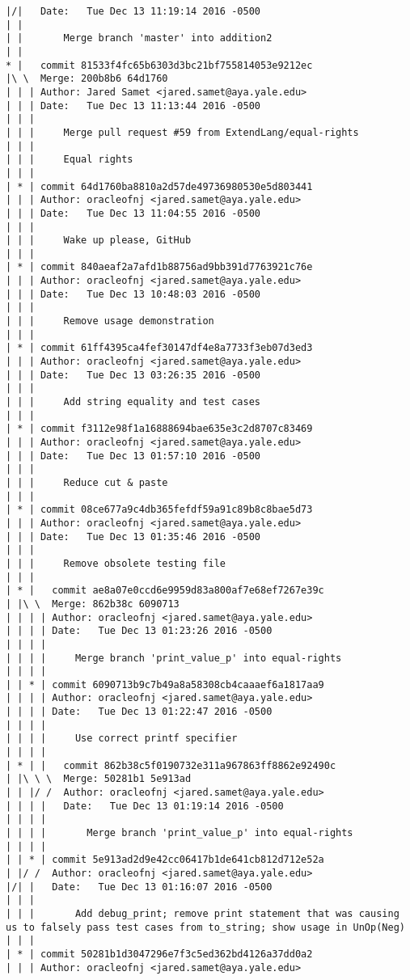 \begin{lstlisting}
|/|   Date:   Tue Dec 13 11:19:14 2016 -0500
| |   
| |       Merge branch 'master' into addition2
| |     
* |   commit 81533f4fc65b6303d3bc21bf755814053e9212ec
|\ \  Merge: 200b8b6 64d1760
| | | Author: Jared Samet <jared.samet@aya.yale.edu>
| | | Date:   Tue Dec 13 11:13:44 2016 -0500
| | | 
| | |     Merge pull request #59 from ExtendLang/equal-rights
| | |     
| | |     Equal rights
| | |    
| * | commit 64d1760ba8810a2d57de49736980530e5d803441
| | | Author: oracleofnj <jared.samet@aya.yale.edu>
| | | Date:   Tue Dec 13 11:04:55 2016 -0500
| | | 
| | |     Wake up please, GitHub
| | |    
| * | commit 840aeaf2a7afd1b88756ad9bb391d7763921c76e
| | | Author: oracleofnj <jared.samet@aya.yale.edu>
| | | Date:   Tue Dec 13 10:48:03 2016 -0500
| | | 
| | |     Remove usage demonstration
| | |    
| * | commit 61ff4395ca4fef30147df4e8a7733f3eb07d3ed3
| | | Author: oracleofnj <jared.samet@aya.yale.edu>
| | | Date:   Tue Dec 13 03:26:35 2016 -0500
| | | 
| | |     Add string equality and test cases
| | |    
| * | commit f3112e98f1a16888694bae635e3c2d8707c83469
| | | Author: oracleofnj <jared.samet@aya.yale.edu>
| | | Date:   Tue Dec 13 01:57:10 2016 -0500
| | | 
| | |     Reduce cut & paste
| | |    
| * | commit 08ce677a9c4db365fefdf59a91c89b8c8bae5d73
| | | Author: oracleofnj <jared.samet@aya.yale.edu>
| | | Date:   Tue Dec 13 01:35:46 2016 -0500
| | | 
| | |     Remove obsolete testing file
| | |      
| * |   commit ae8a07e0ccd6e9959d83a800af7e68ef7267e39c
| |\ \  Merge: 862b38c 6090713
| | | | Author: oracleofnj <jared.samet@aya.yale.edu>
| | | | Date:   Tue Dec 13 01:23:26 2016 -0500
| | | | 
| | | |     Merge branch 'print_value_p' into equal-rights
| | | |     
| | * | commit 6090713b9c7b49a8a58308cb4caaaef6a1817aa9
| | | | Author: oracleofnj <jared.samet@aya.yale.edu>
| | | | Date:   Tue Dec 13 01:22:47 2016 -0500
| | | | 
| | | |     Use correct printf specifier
| | | |       
| * | |   commit 862b38c5f0190732e311a967863ff8862e92490c
| |\ \ \  Merge: 50281b1 5e913ad
| | |/ /  Author: oracleofnj <jared.samet@aya.yale.edu>
| | | |   Date:   Tue Dec 13 01:19:14 2016 -0500
| | | |   
| | | |       Merge branch 'print_value_p' into equal-rights
| | | |     
| | * | commit 5e913ad2d9e42cc06417b1de641cb812d712e52a
| |/ /  Author: oracleofnj <jared.samet@aya.yale.edu>
|/| |   Date:   Tue Dec 13 01:16:07 2016 -0500
| | |   
| | |       Add debug_print; remove print statement that was causing us to falsely pass test cases from to_string; show usage in UnOp(Neg)
| | |    
| * | commit 50281b1d3047296e7f3c5ed362bd4126a37dd0a2
| | | Author: oracleofnj <jared.samet@aya.yale.edu>

\end{lstlisting}
